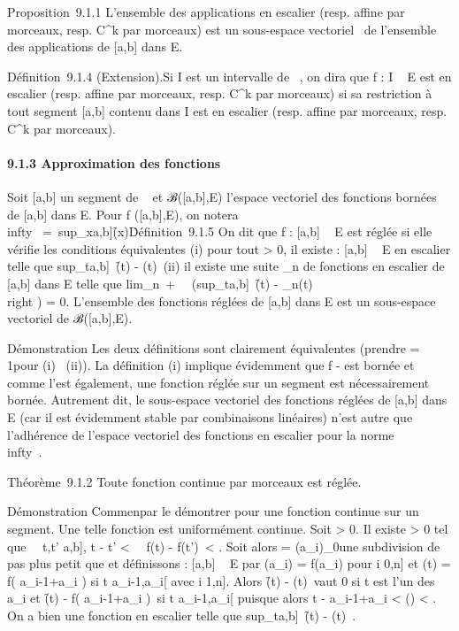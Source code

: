 \documentclass[]{article}
\begin{document}
Proposition~9.1.1 L'ensemble des applications en escalier (resp. affine
par morceaux, resp. C^k par morceaux) est un sous-espace
vectoriel ~de l'ensemble des applications de {[}a,b{]} dans E.

Définition~9.1.4 (Extension).Si I est un intervalle de ~, on dira que f
: I \rightarrow~ E est en escalier (resp. affine par morceaux, resp. C^k
par morceaux) si sa restriction à tout segment {[}a,b{]} contenu dans I
est en escalier (resp. affine par morceaux, resp. C^k par
morceaux).

\paragraph{9.1.3 Approximation des fonctions}

Soit {[}a,b{]} un segment de ~ et ℬ({[}a,b{]},E) l'espace vectoriel des
fonctions bornées de {[}a,b{]} dans E. Pour f ({[}a,b{]},E), on notera
\f\\infty~
=\
sup_x\in{[}a,b{]}\f(x)\.

Définition~9.1.5 On dit que f : {[}a,b{]} \rightarrow~ E est réglée si elle vérifie
les conditions équivalentes (i) pour tout \epsilon \textgreater{} 0, il existe
\phi : {[}a,b{]} \rightarrow~ E en escalier telle que
sup_t\in{[}a,b{]}~\f(t)
- \phi(t)\ \leq \epsilon (ii) il existe une suite
\phi_n de fonctions en escalier de {[}a,b{]} dans E telle que
lim_n\rightarrow~+\infty~~\left
(sup_t\in{[}a,b{]}~\f(t)
- \phi_n(t)\\right ) = 0.
L'ensemble des fonctions réglées de {[}a,b{]} dans E est un sous-espace
vectoriel de ℬ({[}a,b{]},E).

Démonstration Les deux définitions sont clairement équivalentes (prendre
\epsilon = 1\diagupn pour (i) \rigtharrow~(ii)). La définition (i) implique évidemment que f - \phi
est bornée et comme \phi l'est également, une fonction réglée sur un
segment est nécessairement bornée. Autrement dit, le sous-espace
vectoriel des fonctions réglées de {[}a,b{]} dans E (car il est
évidemment stable par combinaisons linéaires) n'est autre que
l'adhérence de l'espace vectoriel des fonctions en escalier pour la
norme \.\\infty~.

Théorème~9.1.2 Toute fonction continue par morceaux est réglée.

Démonstration Commen\ccons par le démontrer pour une
fonction continue sur un segment. Une telle fonction est uniformément
continue. Soit \epsilon \textgreater{} 0. Il existe \eta \textgreater{} 0 tel que
\forall~~t,t' \in {[}a,b{]}, t - t'
\textless{} \eta \rigtharrow~\ f(t) -
f(t')\ \textless{} \epsilon. Soit alors \sigma =
(a_i)_0\leqi\leqn une subdivision de pas plus petit que \eta et
définissons \phi : {[}a,b{]} \rightarrow~ E par \phi(a_i) = f(a_i) pour
i \in {[}0,n{]} et \phi(t) = f( a_i-1+a_i
 ) si t \in{]}a_i-1,a_i{[} avec
i \in {[}1,n{]}. Alors \f(t) -
\phi(t)\ vaut 0 si t est l'un des a_i et
\f(t) - f( a_i-1+a_i
 )\ \leq \epsilon si t
\in{]}a_i-1,a_i{[} puisque alors t -
a_i-1+a_i  
\textless{} \delta(\sigma) \textless{} \eta. On a bien une fonction \phi en escalier
telle que
sup_t\in{[}a,b{]}~\f(t)
- \phi(t)\ \leq \epsilon.
\end{document}
